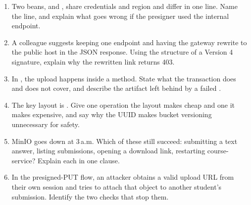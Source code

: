 \begin{quiz}
\begin{enumerate}
  \item Two beans,  and , share
  credentials and region and differ in one line. Name the line, and
  explain what goes wrong if the presigner used the internal endpoint.
  \item A colleague suggests keeping one endpoint and having the gateway
  rewrite  to the public host in the JSON response.
  Using the structure of a Version 4 signature, explain why the rewritten
  link returns 403.
  \item In , the upload happens inside a
   method. State what the transaction does and does
  not cover, and describe the artifact left behind by a failed
  .
  \item The key layout is .
  Give one operation the layout makes cheap and one it makes expensive,
  and say why the UUID makes bucket versioning unnecessary for safety.
  \item MinIO goes down at 3\,a.m. Which of these still succeed:
  submitting a text answer, listing submissions, opening a download
  link, restarting course-service? Explain each in one clause.
  \item In the presigned-PUT flow, an attacker obtains a valid upload
  URL from their own session and tries to attach that object to another
  student's submission. Identify the two checks that stop them.
\end{enumerate}
\end{quiz}
